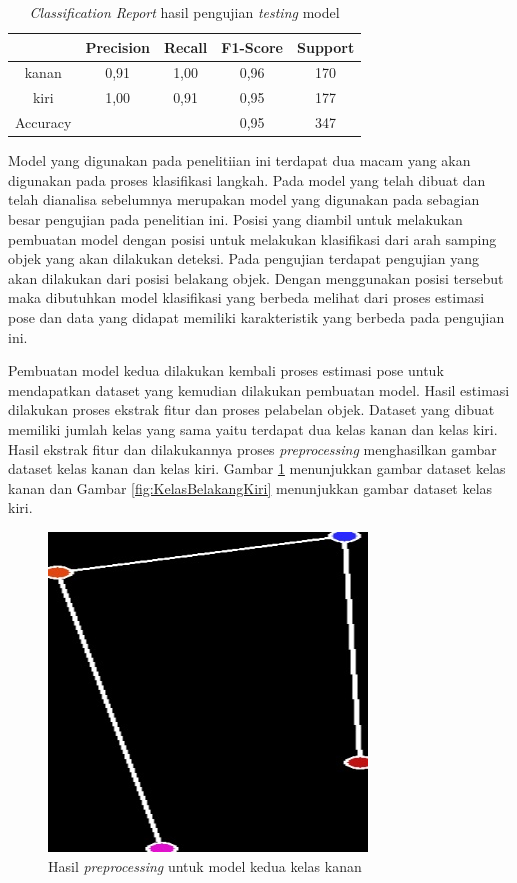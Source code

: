 \begin{longtable}{|c|c|c|c|c|}
  \caption{\emph{Classification Report} hasil pengujian \emph{testing} model}
  \label{tb:ClassificationReport}                                   \\
  \hline
  \rowcolor[HTML]{C0C0C0}
   & \textbf{Precision} & \textbf{Recall} & \textbf{F1-Score} & \textbf{Support} \\
  \hline
  kanan     & 0,91    & 1,00    & 0,96    & 170         \\
  \hline
  kiri      & 1,00    & 0,91    & 0,95    & 177           \\
  \hline
  Accuracy  &         &         & 0,95    & 347            \\
  \hline
\end{longtable}

Model yang digunakan pada penelitiian ini terdapat dua macam yang akan digunakan pada proses klasifikasi langkah. Pada model yang telah dibuat dan telah dianalisa sebelumnya merupakan model yang digunakan pada sebagian besar pengujian pada penelitian ini. Posisi yang diambil untuk melakukan pembuatan model dengan posisi untuk melakukan klasifikasi dari arah samping objek yang akan dilakukan deteksi. Pada pengujian terdapat pengujian yang akan dilakukan dari posisi belakang objek. Dengan menggunakan posisi tersebut maka dibutuhkan model klasifikasi yang berbeda melihat dari proses estimasi pose dan data yang didapat memiliki karakteristik yang berbeda pada pengujian ini. 

Pembuatan model kedua dilakukan kembali proses estimasi pose untuk mendapatkan dataset yang kemudian dilakukan pembuatan model. Hasil estimasi dilakukan proses ekstrak fitur dan proses pelabelan objek. Dataset yang dibuat memiliki jumlah kelas yang sama yaitu terdapat dua kelas kanan dan kelas kiri. Hasil ekstrak fitur dan dilakukannya proses \emph{preprocessing} menghasilkan gambar dataset kelas kanan dan kelas kiri. Gambar \ref{fig:KelasBelakangKanan} menunjukkan gambar dataset kelas kanan dan Gambar \ref{fig:KelasBelakangKiri} menunjukkan gambar dataset kelas kiri.

\begin{figure}[H]
  \centering
  \includegraphics[scale=0.45]{gambar/dataset belakang kanan.jpg}
  \caption{Hasil \emph{preprocessing} untuk model kedua kelas kanan}
  \label{fig:KelasBelakangKanan}
\end{figure}

